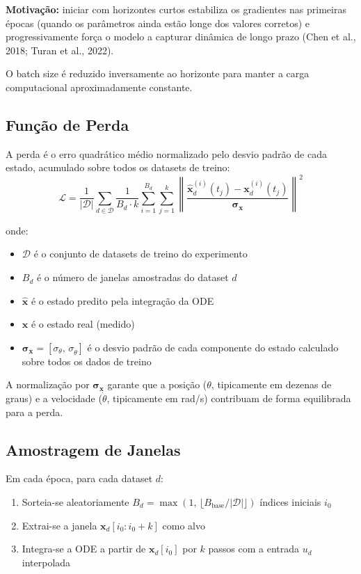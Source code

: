 \documentclass[11pt,a4paper]{article}
\begin{document}
\textbf{Motivação:} iniciar com horizontes curtos estabiliza os gradientes nas primeiras épocas (quando os parâmetros ainda estão longe dos valores corretos) e progressivamente força o modelo a capturar dinâmica de longo prazo (Chen et al., 2018; Turan et al., 2022).

O batch size é reduzido inversamente ao horizonte para manter a carga computacional aproximadamente constante.

\subsection{Função de Perda}

A perda é o erro quadrático médio normalizado pelo desvio padrão de cada estado, acumulado sobre todos os datasets de treino:
%
\begin{equation}
\mathcal{L} = \frac{1}{|\mathcal{D}|} \sum_{d \in \mathcal{D}} \frac{1}{B_d \cdot k} \sum_{i=1}^{B_d} \sum_{j=1}^{k} \left\| \frac{\hat{\mathbf{x}}_d^{(i)}(t_j) - \mathbf{x}_d^{(i)}(t_j)}{\boldsymbol{\sigma}_{\mathbf{x}}} \right\|^2
\end{equation}

onde:
\begin{itemize}
    \item $\mathcal{D}$ é o conjunto de datasets de treino do experimento
    \item $B_d$ é o número de janelas amostradas do dataset $d$
    \item $\hat{\mathbf{x}}$ é o estado predito pela integração da ODE
    \item $\mathbf{x}$ é o estado real (medido)
    \item $\boldsymbol{\sigma}_{\mathbf{x}} = [\sigma_\theta,\, \sigma_{\dot\theta}]$ é o desvio padrão de cada componente do estado calculado sobre todos os dados de treino
\end{itemize}

A normalização por $\boldsymbol{\sigma}_{\mathbf{x}}$ garante que a posição ($\theta$, tipicamente em dezenas de graus) e a velocidade ($\dot\theta$, tipicamente em rad/s) contribuam de forma equilibrada para a perda.

\subsection{Amostragem de Janelas}

Em cada época, para cada dataset $d$:
\begin{enumerate}
    \item Sorteia-se aleatoriamente $B_d = \max(1,\, \lfloor B_{\text{base}} / |\mathcal{D}| \rfloor)$ índices iniciais $i_0$
    \item Extrai-se a janela $\mathbf{x}_d[i_0 : i_0 + k]$ como alvo
    \item Integra-se a ODE a partir de $\mathbf{x}_d[i_0]$ por $k$ passos com a entrada $u_d$ interpolada
\end{enumerate}
\end{document}
